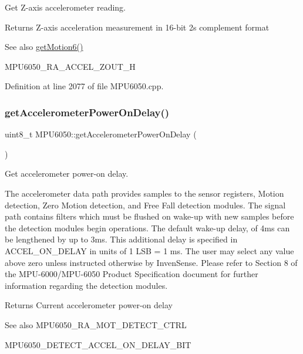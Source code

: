 Get Z-\/axis accelerometer reading. 

\begin{DoxyReturn}{Returns}
Z-\/axis acceleration measurement in 16-\/bit 2\textquotesingle{}s complement format 
\end{DoxyReturn}
\begin{DoxySeeAlso}{See also}
\mbox{\hyperlink{classMPU6050_a574d3093dc131e4251a9b37adf208ca7}{get\+Motion6()}} 

M\+P\+U6050\+\_\+\+R\+A\+\_\+\+A\+C\+C\+E\+L\+\_\+\+Z\+O\+U\+T\+\_\+H 
\end{DoxySeeAlso}


Definition at line 2077 of file M\+P\+U6050.\+cpp.

\mbox{\label{classMPU6050_aae903df2accc687423f9cd0a78f9cd32}} 
\subsubsection{\texorpdfstring{getAccelerometerPowerOnDelay()}{getAccelerometerPowerOnDelay()}}
{\footnotesize\ttfamily uint8\+\_\+t M\+P\+U6050\+::get\+Accelerometer\+Power\+On\+Delay (\begin{DoxyParamCaption}{ }\end{DoxyParamCaption})}



Get accelerometer power-\/on delay. 

The accelerometer data path provides samples to the sensor registers, Motion detection, Zero Motion detection, and Free Fall detection modules. The signal path contains filters which must be flushed on wake-\/up with new samples before the detection modules begin operations. The default wake-\/up delay, of 4ms can be lengthened by up to 3ms. This additional delay is specified in A\+C\+C\+E\+L\+\_\+\+O\+N\+\_\+\+D\+E\+L\+AY in units of 1 L\+SB = 1 ms. The user may select any value above zero unless instructed otherwise by Inven\+Sense. Please refer to Section 8 of the M\+P\+U-\/6000/\+M\+P\+U-\/6050 Product Specification document for further information regarding the detection modules. \begin{DoxyReturn}{Returns}
Current accelerometer power-\/on delay 
\end{DoxyReturn}
\begin{DoxySeeAlso}{See also}
M\+P\+U6050\+\_\+\+R\+A\+\_\+\+M\+O\+T\+\_\+\+D\+E\+T\+E\+C\+T\+\_\+\+C\+T\+RL 

M\+P\+U6050\+\_\+\+D\+E\+T\+E\+C\+T\+\_\+\+A\+C\+C\+E\+L\+\_\+\+O\+N\+\_\+\+D\+E\+L\+A\+Y\+\_\+\+B\+IT 
\end{DoxySeeAlso}


